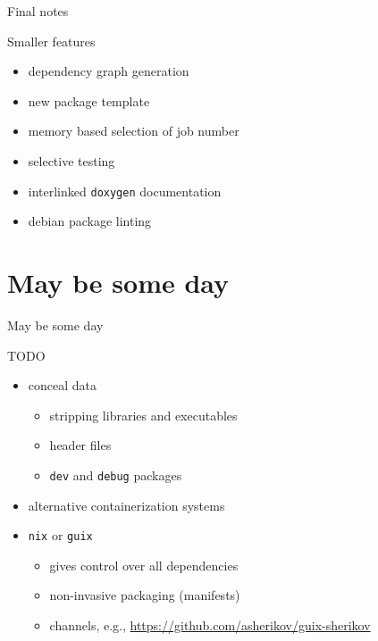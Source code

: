 \documentclass[hyperref={colorlinks=false, breaklinks=true},11pt]{beamer}
\begin{document}
\begin{frame}{Final notes}
    \begin{block}{Smaller features}
        \begin{itemize}
            \item dependency graph generation
            \item new package template
            \item memory based selection of job number
            \item selective testing
            \item interlinked \texttt{doxygen} documentation
            \item debian package linting
        \end{itemize}
    \end{block}
\end{frame}


\section{May be some day}

\begin{frame}{May be some day}
    \begin{block}{TODO}
        \begin{itemize}
            \item conceal data
                \begin{itemize}
                    \item stripping libraries and executables
                    \item header files
                    \item \texttt{dev} and \texttt{debug} packages
                \end{itemize}
            \item alternative containerization systems
            \item \texttt{nix} or \texttt{guix}
                \begin{itemize}
                    \item gives control over all dependencies
                    \item non-invasive packaging (manifests)
                    \item channels, e.g., \url{https://github.com/asherikov/guix-sherikov}
                \end{itemize}
        \end{itemize}
    \end{block}
\end{frame}
\end{document}
